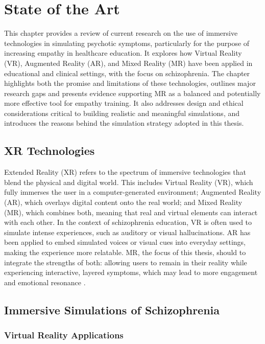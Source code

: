 \chapter{State of the Art}
\label{ch:background}

This chapter provides a review of current research on the use of immersive technologies in simulating psychotic symptoms, particularly for the purpose of increasing empathy in healthcare education. It explores how Virtual Reality (VR), Augmented Reality (AR), and Mixed Reality (MR) have been applied in educational and clinical settings, with the focus on schizophrenia. The chapter highlights both the promise and limitations of these technologies, outlines major research gaps and presents evidence supporting MR as a balanced and potentially more effective tool for empathy training. It also addresses design and ethical considerations critical to building realistic and meaningful simulations, and introduces the reasons behind the simulation strategy adopted in this thesis.

\section{XR Technologies}
Extended Reality (XR) refers to the spectrum of immersive technologies that blend the physical and digital world. This includes Virtual Reality (VR), which fully immerses the user in a computer-generated environment; Augmented Reality (AR), which overlays digital content onto the real world; and Mixed Reality (MR), which combines both, meaning that real and virtual elements can interact with each other. In the context of schizophrenia education, VR is often used to simulate intense experiences, such as auditory or visual hallucinations. AR has been applied to embed simulated voices or visual cues into everyday settings, making the experience more relatable. MR, the focus of this thesis, should to integrate the strengths of both: allowing users to remain in their reality while experiencing interactive, layered symptoms, which may lead to more engagement and emotional resonance \cite{Krogmeier2024, Silva2017, Zare-Bidaki2022}.

\section{Immersive Simulations of Schizophrenia}
\subsection{Virtual Reality Applications}

